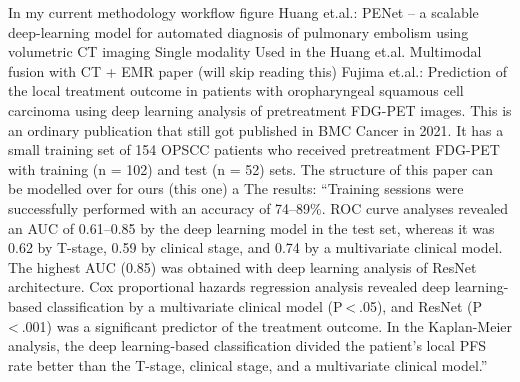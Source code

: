 \documentclass{article}%
\begin{document}
\newline%
\newline%
%
In my current methodology workflow figure %
\newline%
\newline%
%
%
\newline%
\newline%
%
%
\newline%
\newline%
%
Huang et.al.: PENet – a scalable deep{-}learning model for automated diagnosis of pulmonary embolism using volumetric CT imaging %
\newline%
\newline%
%
Single modality %
\newline%
\newline%
%
Used in the Huang et.al. Multimodal fusion with CT + EMR paper (will skip reading this) %
\newline%
\newline%
%
Fujima et.al.: Prediction of the local treatment outcome in patients with oropharyngeal squamous cell carcinoma using deep learning analysis of pretreatment FDG{-}PET images. %
\newline%
\newline%
%
This is an ordinary publication that still got published in BMC Cancer in 2021. It has a small training set of 154 OPSCC patients who received pretreatment FDG{-}PET with training (n = 102) and test (n = 52) sets. %
\newline%
\newline%
%
The structure of this paper can be modelled over for ours (this one) a%
\newline%
\newline%
%
The results: “Training sessions were successfully performed with an accuracy of 74–89\%. ROC curve analyses revealed an AUC of 0.61–0.85 by the deep learning model in the test set, whereas it was 0.62 by T{-}stage, 0.59 by clinical stage, and 0.74 by a multivariate clinical model. The highest AUC (0.85) was obtained with deep learning analysis of ResNet architecture. Cox proportional hazards regression analysis revealed deep learning{-}based classification by a multivariate clinical model (P < .05), and ResNet (P < .001) was a significant predictor of the treatment outcome. In the Kaplan{-}Meier analysis, the deep learning{-}based classification divided the patient’s local PFS rate better than the T{-}stage, clinical stage, and a multivariate clinical model.”%
\newline%
\newline%
\end{document}
